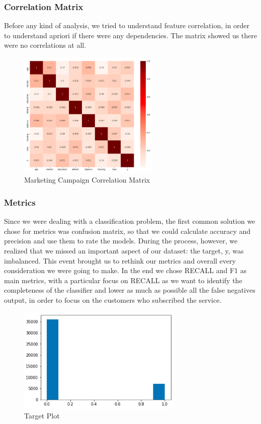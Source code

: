 \subsubsection{Correlation Matrix}
Before any kind of analysis, we tried to understand feature correlation, in order to understand apriori if there were any dependencies. The matrix showed us there were no correlations at all.
\begin{figure}[H]
\centering
\includegraphics[width=0.6\textwidth]{Img/correlation_bank.png}
\caption{Marketing Campaign Correlation Matrix}
\end{figure}
\vspace{-1cm}
\subsubsection{Metrics}
Since we were dealing with a classification problem, the first common solution we chose for metrics was confusion matrix, so that we could calculate accuracy and precision and use them to rate the models. During the process, however, we realized that we missed an important aspect of our dataset: the target, y, was imbalanced.
This event brought us to rethink our metrics and overall every consideration we were going to make. In the end we chose RECALL and F1 as main metrics, with a particular focus on RECALL as we want to identify the completeness of the classifier and lower as much as possible all the false negatives output, in order to focus on the customers who subscribed the service. 

\begin{figure}[H]
\centering
\includegraphics[width=0.7\textwidth]{Img/imbalanced.png}
\caption{Target Plot}
\end{figure}
\clearpage
